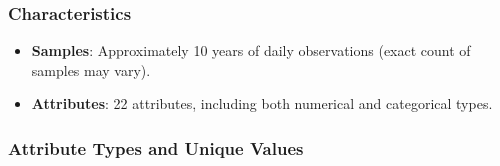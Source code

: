 \documentclass[11pt]{article}
\providecommand{\tightlist}{%
      \setlength{\itemsep}{0pt}\setlength{\parskip}{0pt}}
\begin{document}
\subsubsection{Characteristics}\label{characteristics}

\begin{itemize}
\tightlist
\item
  \textbf{Samples}: Approximately 10 years of daily observations (exact
  count of samples may vary).
\item
  \textbf{Attributes}: 22 attributes, including both numerical and
  categorical types.
\end{itemize}

\subsubsection{Attribute Types and Unique
Values}\label{attribute-types-and-unique-values}
\end{document}
